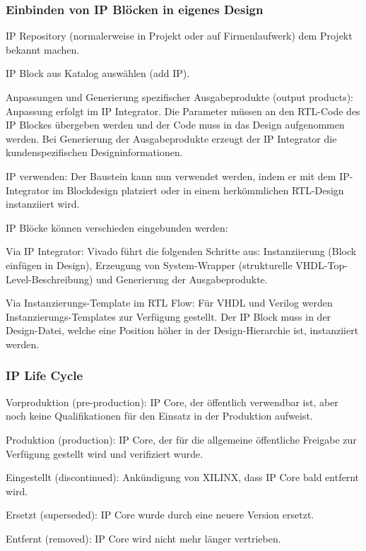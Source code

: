 \subsubsection{Einbinden von IP Blöcken in eigenes Design}
\begin{compactenum}
    \item IP Repository (normalerweise in Projekt oder auf Firmenlaufwerk) dem Projekt bekannt machen.
    \item IP Block aus Katalog auswählen (add IP).
    \item Anpassungen und Generierung spezifischer Ausgabeprodukte (output products): Anpassung erfolgt im IP Integrator. Die Parameter müssen an den RTL-Code des IP Blockes übergeben werden und der Code muss in  das Design aufgenommen werden. Bei Generierung der Ausgabeprodukte erzeugt der IP Integrator die kundenspezifischen Designinformationen.
    \item IP verwenden: Der Baustein kann nun verwendet werden, indem er mit dem IP-Integrator im Blockdesign platziert oder in einem herkömmlichen RTL-Design instanziiert wird. 
\end{compactenum}
IP Blöcke können verschieden eingebunden werden:
\begin{compactitem}
        \item Via IP Integrator: Vivado führt die folgenden Schritte aus: Instanziierung (Block einfügen in Design), Erzeugung von System-Wrapper (strukturelle VHDL-Top-Level-Beschreibung) und Generierung der Ausgabeprodukte.
        \item Via Instanzierungs-Template im RTL Flow: Für VHDL und Verilog werden Instanzierungs-Templates zur Verfügung gestellt. Der IP Block muss in der Design-Datei, welche eine Position höher in der Design-Hierarchie ist, instanziiert werden.   
\end{compactitem}

\subsubsection{IP Life Cycle}
\begin{compactitem}
        \item Vorproduktion (pre-production): IP Core, der öffentlich verwendbar ist, aber noch keine Qualifikationen für den Einsatz in der Produktion aufweist.
        \item Produktion (production): IP Core, der für die allgemeine öffentliche Freigabe zur Verfügung gestellt wird und verifiziert wurde. 
        \item Eingestellt (discontinued): Ankündigung von XILINX, dass IP Core bald entfernt wird.
        \item Ersetzt (superseded): IP Core wurde durch eine neuere Version ersetzt.
        \item Entfernt (removed): IP Core wird nicht mehr länger vertrieben.
\end{compactitem}
